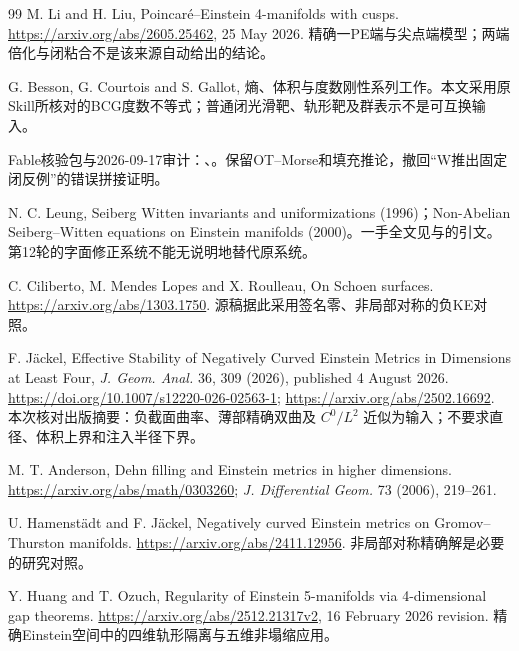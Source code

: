 \documentclass[UTF8,fontset=fandol,zihao=-4]{ctexart}
\theoremstyle{research}
\begin{document}
\begin{thebibliography}{99}
 M. Li and H. Liu, Poincaré--Einstein 4-manifolds with cusps. \url{https://arxiv.org/abs/2605.25462}, 25 May 2026. 精确一PE端与尖点端模型；两端倍化与闭粘合不是该来源自动给出的结论。

 G. Besson, G. Courtois and S. Gallot, 熵、体积与度数刚性系列工作。本文采用原Skill所核对的BCG度数不等式；普通闭光滑靶、轨形靶及群表示不是可互换输入。

 Fable核验包与2026-09-17审计：、。保留OT--Morse和填充推论，撤回“W推出固定闭反例”的错误拼接证明。

 N. C. Leung, Seiberg Witten invariants and uniformizations (1996)；Non-Abelian Seiberg--Witten equations on Einstein manifolds (2000)。一手全文见与的引文。第12轮的字面修正系统不能无说明地替代原系统。

 C. Ciliberto, M. Mendes Lopes and X. Roulleau, On Schoen surfaces. \url{https://arxiv.org/abs/1303.1750}. 源稿据此采用签名零、非局部对称的负KE对照。

 F. Jäckel, Effective Stability of Negatively Curved Einstein Metrics in Dimensions at Least Four, \emph{J. Geom. Anal.} 36, 309 (2026), published 4 August 2026. \url{https://doi.org/10.1007/s12220-026-02563-1}; \url{https://arxiv.org/abs/2502.16692}. 本次核对出版摘要：负截面曲率、薄部精确双曲及 $C^0/L^2$ 近似为输入；不要求直径、体积上界和注入半径下界。

 M. T. Anderson, Dehn filling and Einstein metrics in higher dimensions. \url{https://arxiv.org/abs/math/0303260}; \emph{J. Differential Geom.} 73 (2006), 219--261.

 U. Hamenstädt and F. Jäckel, Negatively curved Einstein metrics on Gromov--Thurston manifolds. \url{https://arxiv.org/abs/2411.12956}. 非局部对称精确解是必要的研究对照。

 Y. Huang and T. Ozuch, Regularity of Einstein 5-manifolds via 4-dimensional gap theorems. \url{https://arxiv.org/abs/2512.21317v2}, 16 February 2026 revision. 精确Einstein空间中的四维轨形隔离与五维非塌缩应用。

\end{thebibliography}
\end{document}
